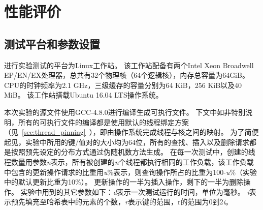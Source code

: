 \section{性能评价}
\subsection{测试平台和参数设置}
进行实验测试的平台为Linux工作站。
该工作站配备有两个Intel Xeon Broadwell EP/EN/EX处理器，总共有32个物理核（64个逻辑核），内存总容量为64GiB。
CPU的时钟频率为2.1 GHz，三级缓存的容量分别为64 KiB，256 KiB以及40 MiB。
该工作站搭载Ubuntu 16.04 LTS操作系统。

本次实验的源文件使用GCC-4.8.0进行编译生成可执行文件。
下文中如非特别说明，所有的可执行文件的编译都是使用默认的线程绑定方案（见~\ref{sec:thread_pinning}~），即由操作系统完成线程与核之间的映射。
为了简便起见，实验中所用的键/值对的大小均为64位，所有的查找、插入以及删除请求都是按照预先设定的分布方式通过伪随机数方法生成。
在每一次测试中，创建的线程数量用参数\textit{n}表示，所有被创建的\textit{n}个线程都执行相同的工作负载，该工作负载中包含的更新操作请求的比重用\textit{u}\%表示，则查询操作所占的比重为100-\textit{u}\%（实验中的默认更新比重为10\%）。
更新操作的一半为插入操作，剩下的一半为删除操作。
实验中用到的其它参数如下：\textit{d}表示一次测试运行的时间，单位为毫秒。
\textit{i}表示预先填充至哈希表中的元素的个数，\textit{r}表示键的范围，r的范围为0到2\textit{i}。

